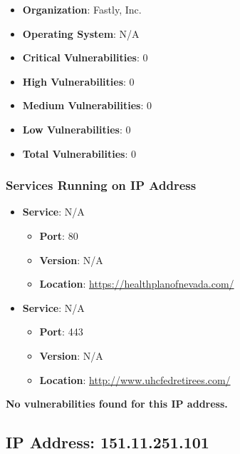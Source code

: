 \documentclass{article}
\begin{document}
\begin{itemize}
    \item \textbf{Organization}: Fastly, Inc.
    \item \textbf{Operating System}:  N/A 
    \item \textbf{Critical Vulnerabilities}: 0
    \item \textbf{High Vulnerabilities}: 0
    \item \textbf{Medium Vulnerabilities}: 0
    \item \textbf{Low Vulnerabilities}: 0
    \item \textbf{Total Vulnerabilities}: 0
\end{itemize}

\subsubsection*{Services Running on IP Address}

\begin{itemize}
    
        \item \textbf{Service}: N/A
        \begin{itemize}
            \item \textbf{Port}: 80
            \item \textbf{Version}:  N/A 
            \item \textbf{Location}: \href{ https://healthplanofnevada.com/ }{ https://healthplanofnevada.com/ }
        \end{itemize}
    
        \item \textbf{Service}: N/A
        \begin{itemize}
            \item \textbf{Port}: 443
            \item \textbf{Version}:  N/A 
            \item \textbf{Location}: \href{ http://www.uhcfedretirees.com/ }{ http://www.uhcfedretirees.com/ }
        \end{itemize}
    
\end{itemize}


\textbf{No vulnerabilities found for this IP address.}




\clearpage



\subsection*{IP Address: 151.11.251.101}
\end{document}
